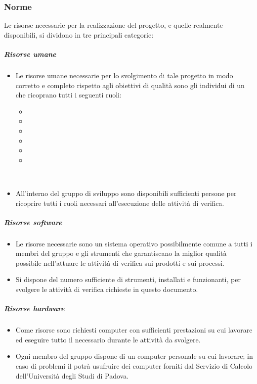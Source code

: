 \documentclass[a4paper, titlepage]{article}
\begin{document}
\subsubsection{Norme}

Le risorse necessarie per la realizzazione del progetto, e quelle realmente disponibili, si dividono in tre principali categorie:
\subparagraph{Risorse umane}
\begin{itemize}
	\item {}
	\newline Le risorse umane necessarie per lo svolgimento di tale progetto in modo corretto e completo rispetto agli obiettivi di qualità sono gli individui di un  che ricoprano tutti i seguenti ruoli:
	\begin{itemize}
		\item {}
		\item {}
		\item {}
		\item {}
		\item {}
		\item {}
	\end{itemize}
	\ 
	\item {}
	\newline All'interno del gruppo di sviluppo sono disponibili sufficienti persone per ricoprire tutti i ruoli necessari all'esecuzione delle attività di verifica.
\end{itemize}

\subparagraph{Risorse software}
\begin{itemize}
	\item {}
	\newline Le risorse  necessarie sono un sistema operativo possibilmente comune a tutti i membri del gruppo e gli strumenti che garantiscano la miglior qualità possibile nell'attuare le attività di verifica sui prodotti e sui processi. 
	\ 
	\item \bold{Disponibili}
	\newline  Si dispone del numero sufficiente di strumenti, installati e funzionanti, per svolgere le attività di verifica richieste in questo documento.
\end{itemize}

\subparagraph{Risorse hardware}
\begin{itemize}
	\item {}
	\newline Come risorse  sono richiesti computer con sufficienti prestazioni su cui lavorare ed eseguire tutto il  necessario durante le attività da svolgere.
	\ 
	\item {}
	\newline Ogni membro del gruppo dispone di un computer personale su cui lavorare; in caso di problemi il \gl{team} potrà usufruire dei computer forniti dal Servizio di Calcolo dell’Università degli Studi di Padova.
\end{itemize}
\end{document}
